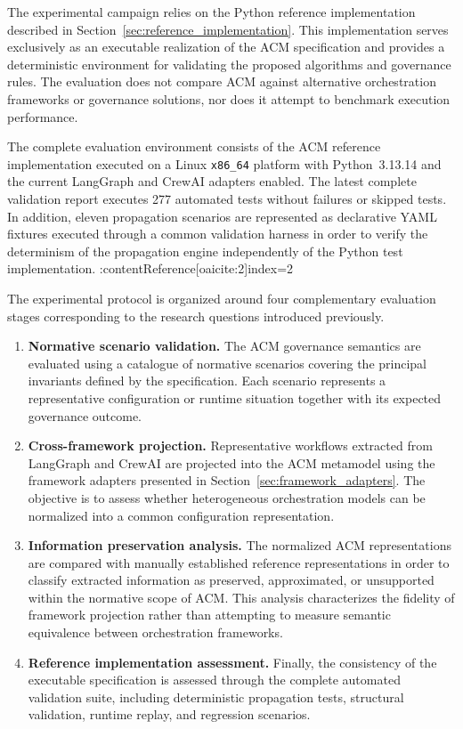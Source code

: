 \documentclass[10pt]{article}
\begin{document}
The experimental campaign relies on the Python reference implementation described in Section~\ref{sec:reference_implementation}. This implementation serves exclusively as an executable realization of the ACM specification and provides a deterministic environment for validating the proposed algorithms and governance rules. The evaluation does not compare ACM against alternative orchestration frameworks or governance solutions, nor does it attempt to benchmark execution performance.

The complete evaluation environment consists of the ACM reference implementation executed on a Linux \texttt{x86\_64} platform with Python~3.13.14 and the current LangGraph and CrewAI adapters enabled. The latest complete validation report executes 277 automated tests without failures or skipped tests. In addition, eleven propagation scenarios are represented as declarative YAML fixtures executed through a common validation harness in order to verify the determinism of the propagation engine independently of the Python test implementation. :contentReference[oaicite:2]{index=2}

The experimental protocol is organized around four complementary evaluation stages corresponding to the research questions introduced previously.

\begin{enumerate}[leftmargin=*]
    \item \textbf{Normative scenario validation.} The ACM governance semantics are evaluated using a catalogue of normative scenarios covering the principal invariants defined by the specification. Each scenario represents a representative configuration or runtime situation together with its expected governance outcome.

    \item \textbf{Cross-framework projection.} Representative workflows extracted from LangGraph and CrewAI are projected into the ACM metamodel using the framework adapters presented in Section~\ref{sec:framework_adapters}. The objective is to assess whether heterogeneous orchestration models can be normalized into a common configuration representation.

    \item \textbf{Information preservation analysis.} The normalized ACM representations are compared with manually established reference representations in order to classify extracted information as preserved, approximated, or unsupported within the normative scope of ACM. This analysis characterizes the fidelity of framework projection rather than attempting to measure semantic equivalence between orchestration frameworks.

    \item \textbf{Reference implementation assessment.} Finally, the consistency of the executable specification is assessed through the complete automated validation suite, including deterministic propagation tests, structural validation, runtime replay, and regression scenarios.
\end{enumerate}
\end{document}
